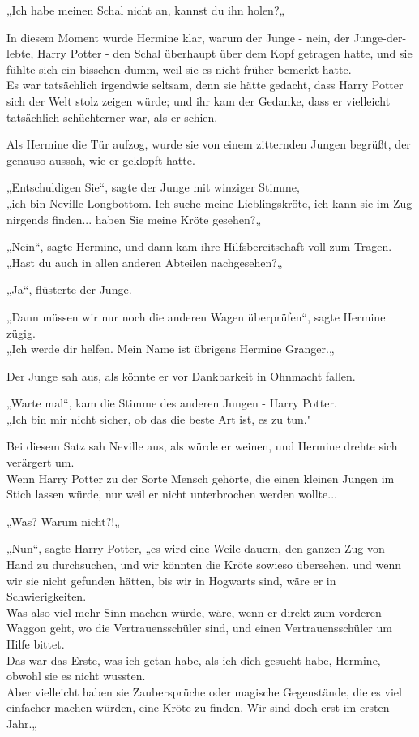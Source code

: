 {„Ich habe meinen Schal nicht an, kannst du ihn holen?„

In diesem Moment wurde Hermine klar, warum der Junge - nein, der Junge-der-lebte, Harry Potter - den Schal überhaupt über dem Kopf getragen hatte, und sie fühlte sich ein bisschen dumm, weil sie es nicht früher bemerkt hatte.\\ Es war tatsächlich irgendwie seltsam, denn sie hätte gedacht, dass Harry Potter sich der Welt stolz zeigen würde; und ihr kam der Gedanke, dass er vielleicht tatsächlich schüchterner war, als er schien.

Als Hermine die Tür aufzog, wurde sie von einem zitternden Jungen begrüßt, der genauso aussah, wie er geklopft hatte.

„Entschuldigen Sie“, sagte der Junge mit winziger Stimme,\\ „ich bin Neville Longbottom. Ich suche meine Lieblingskröte, ich kann sie im Zug nirgends finden... haben Sie meine Kröte gesehen?„

„Nein“, sagte Hermine, und dann kam ihre Hilfsbereitschaft voll zum Tragen.\\ „Hast du auch in allen anderen Abteilen nachgesehen?„

„Ja“, flüsterte der Junge.

„Dann müssen wir nur noch die anderen Wagen überprüfen“, sagte Hermine zügig.\\ „Ich werde dir helfen. Mein Name ist übrigens Hermine Granger.„

Der Junge sah aus, als könnte er vor Dankbarkeit in Ohnmacht fallen.

„Warte mal“, kam die Stimme des anderen Jungen - Harry Potter.\\ „Ich bin mir nicht sicher, ob das die beste Art ist, es zu tun."

Bei diesem Satz sah Neville aus, als würde er weinen, und Hermine drehte sich verärgert um.\\ Wenn Harry Potter zu der Sorte Mensch gehörte, die einen kleinen Jungen im Stich lassen würde, nur weil er nicht unterbrochen werden wollte...

„Was? Warum nicht?!„

„Nun“, sagte Harry Potter, „es wird eine Weile dauern, den ganzen Zug von Hand zu durchsuchen, und wir könnten die Kröte sowieso übersehen, und wenn wir sie nicht gefunden hätten, bis wir in Hogwarts sind, wäre er in Schwierigkeiten.\\ Was also viel mehr Sinn machen würde, wäre, wenn er direkt zum vorderen Waggon geht, wo die Vertrauensschüler sind, und einen Vertrauensschüler um Hilfe bittet.\\ Das war das Erste, was ich getan habe, als ich dich gesucht habe, Hermine, obwohl sie es nicht wussten.\\ Aber vielleicht haben sie Zaubersprüche oder magische Gegenstände, die es viel einfacher machen würden, eine Kröte zu finden. Wir sind doch erst im ersten Jahr.„

}
